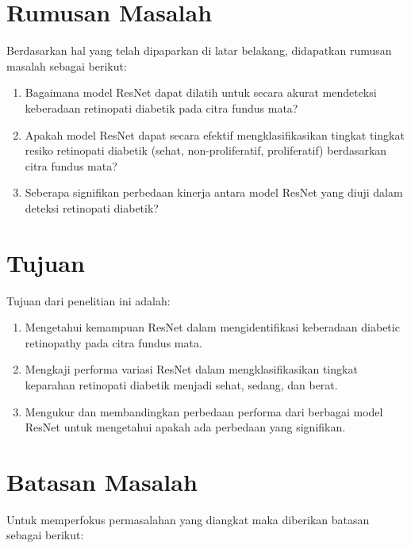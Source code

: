 \section{Rumusan Masalah}
\label{sec:permasalahan}

Berdasarkan hal yang telah dipaparkan di latar belakang, didapatkan rumusan masalah sebagai berikut:
\begin{enumerate}
	\item Bagaimana model ResNet dapat dilatih untuk secara akurat mendeteksi keberadaan retinopati diabetik pada citra fundus mata?
	\item Apakah model ResNet dapat secara efektif mengklasifikasikan tingkat tingkat resiko retinopati diabetik (sehat, non-proliferatif, proliferatif) berdasarkan citra fundus mata?
	\item Seberapa signifikan perbedaan kinerja antara model ResNet yang diuji dalam deteksi retinopati diabetik?
\end{enumerate}

\section{Tujuan}
\label{sec:Tujuan}

Tujuan dari penelitian ini adalah:
\begin{enumerate}
	\item Mengetahui kemampuan ResNet dalam mengidentifikasi keberadaan diabetic retinopathy pada citra fundus mata.
	\item Mengkaji performa variasi ResNet dalam mengklasifikasikan tingkat keparahan retinopati diabetik menjadi sehat, sedang, dan berat.
	\item Mengukur dan membandingkan perbedaan performa dari berbagai model ResNet untuk mengetahui apakah ada perbedaan yang signifikan.
\end{enumerate}

\section{Batasan Masalah}
\label{sec:batasanmasalah}

Untuk memperfokus permasalahan yang diangkat maka diberikan batasan sebagai berikut:

